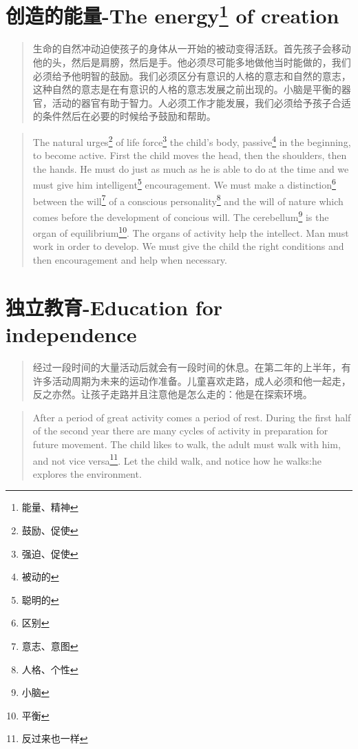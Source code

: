 \documentclass[lang=cn,10pt]{elegantbook}
\begin{document}
\chapter{创造的能量-The energy\footnote{能量、精神} of creation}

\begin{quote}
{\small 生命的自然冲动迫使孩子的身体从一开始的被动变得活跃。首先孩子会移动他的头，然后是肩膀，然后是手。他必须尽可能多地做他当时能做的，我们必须给予他明智的鼓励。我们必须区分有意识的人格的意志和自然的意志，这种自然的意志是在有意识的人格的意志发展之前出现的。小脑是平衡的器官，活动的器官有助于智力。人必须工作才能发展，我们必须给予孩子合适的条件然后在必要的时候给予鼓励和帮助。}
\end{quote}

\begin{tcolorbox}
\begin{quote}
{\small The natural urges\footnote{鼓励、促使} of life force\footnote{强迫、促使} the child's body, passive\footnote{被动的} in the beginning, to become active. First the child moves the head, then the shoulders, then the hands. He must do just as much as he is able to do at the time and we must give him intelligent\footnote{聪明的} encouragement. We must make a distinction\footnote{区别} between the will\footnote{意志、意图} of a conscious personality\footnote{人格、个性} and the will of nature which comes before the development of concious will. The cerebellum\footnote{小脑} is the organ of equilibrium\footnote{平衡}. The organs of activity help the intellect. Man must work in order to develop. We must give the child the right conditions and then encouragement and help when necessary.}
\end{quote}
\end{tcolorbox}


\chapter{独立教育-Education for independence}

\begin{quote}
{\small 经过一段时间的大量活动后就会有一段时间的休息。在第二年的上半年，有许多活动周期为未来的运动作准备。儿童喜欢走路，成人必须和他一起走，反之亦然。让孩子走路并且注意他是怎么走的：他是在探索环境。}
\end{quote}

\begin{tcolorbox}
\begin{quote}
{\small After a period of great activity comes a period of rest. During the first half of the second year there are many cycles of activity in preparation for future movement. The child likes to walk, the adult must walk with him, and not vice versa\footnote{反过来也一样}. Let the child walk, and notice how he walks:he explores the environment.}
\end{quote}
\end{tcolorbox}
\end{document}
